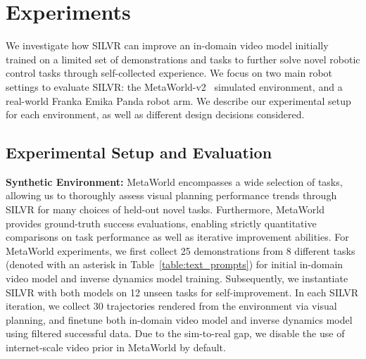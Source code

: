\section{Experiments}

We investigate how SILVR can improve an in-domain video model initially trained on a limited set of demonstrations and tasks to further solve novel robotic control tasks through self-collected experience.  We focus on two main robot settings to evaluate SILVR: the MetaWorld-v2~\citep{yu2020meta} simulated environment, and a real-world Franka Emika Panda robot arm.  We describe our experimental setup for each environment, as well as different design decisions considered.

\subsection{Experimental Setup and Evaluation}
\label{sec:experimental_setup}
\textbf{Synthetic Environment:} MetaWorld encompasses a wide selection of tasks, allowing us to thoroughly assess visual planning performance trends through SILVR for many choices of held-out novel tasks.  Furthermore, MetaWorld provides ground-truth success evaluations, enabling strictly quantitative comparisons on task performance as well as iterative improvement abilities.  For MetaWorld experiments, we first collect 25 demonstrations from 8 different tasks (denoted with an asterisk in Table~\ref{table:text_prompts}) for initial in-domain video model and inverse dynamics model training. Subsequently, we instantiate SILVR with both models on 12 unseen tasks for self-improvement. In each SILVR iteration, we collect 30 trajectories rendered from the environment via visual planning, and finetune both in-domain video model and inverse dynamics model using filtered successful data. Due to the sim-to-real gap, we disable the use of internet-scale video prior in MetaWorld by default.


